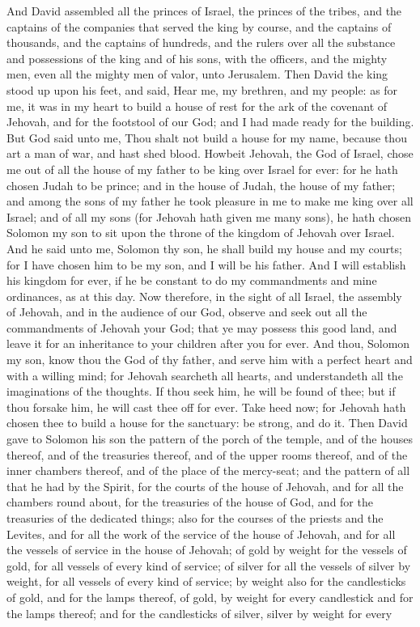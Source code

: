 And David assembled all the princes of Israel, the princes of the tribes, and the captains of the companies that served the king by course, and the captains of thousands, and the captains of hundreds, and the rulers over all the substance and possessions of the king and of his sons, with the officers, and the mighty men, even all the mighty men of valor, unto Jerusalem. Then David the king stood up upon his feet, and said, Hear me, my brethren, and my people: as for me, it was in my heart to build a house of rest for the ark of the covenant of Jehovah, and for the footstool of our God; and I had made ready for the building. But God said unto me, Thou shalt not build a house for my name, because thou art a man of war, and hast shed blood. Howbeit Jehovah, the God of Israel, chose me out of all the house of my father to be king over Israel for ever: for he hath chosen Judah to be prince; and in the house of Judah, the house of my father; and among the sons of my father he took pleasure in me to make me king over all Israel; and of all my sons (for Jehovah hath given me many sons), he hath chosen Solomon my son to sit upon the throne of the kingdom of Jehovah over Israel. And he said unto me, Solomon thy son, he shall build my house and my courts; for I have chosen him to be my son, and I will be his father. And I will establish his kingdom for ever, if he be constant to do my commandments and mine ordinances, as at this day. Now therefore, in the sight of all Israel, the assembly of Jehovah, and in the audience of our God, observe and seek out all the commandments of Jehovah your God; that ye may possess this good land, and leave it for an inheritance to your children after you for ever.  And thou, Solomon my son, know thou the God of thy father, and serve him with a perfect heart and with a willing mind; for Jehovah searcheth all hearts, and understandeth all the imaginations of the thoughts. If thou seek him, he will be found of thee; but if thou forsake him, he will cast thee off for ever. Take heed now; for Jehovah hath chosen thee to build a house for the sanctuary: be strong, and do it.  Then David gave to Solomon his son the pattern of the porch of the temple, and of the houses thereof, and of the treasuries thereof, and of the upper rooms thereof, and of the inner chambers thereof, and of the place of the mercy-seat; and the pattern of all that he had by the Spirit, for the courts of the house of Jehovah, and for all the chambers round about, for the treasuries of the house of God, and for the treasuries of the dedicated things; also for the courses of the priests and the Levites, and for all the work of the service of the house of Jehovah, and for all the vessels of service in the house of Jehovah; of gold by weight for the vessels of gold, for all vessels of every kind of service; of silver for all the vessels of silver by weight, for all vessels of every kind of service; by weight also for the candlesticks of gold, and for the lamps thereof, of gold, by weight for every candlestick and for the lamps thereof; and for the candlesticks of silver, silver by weight for every 